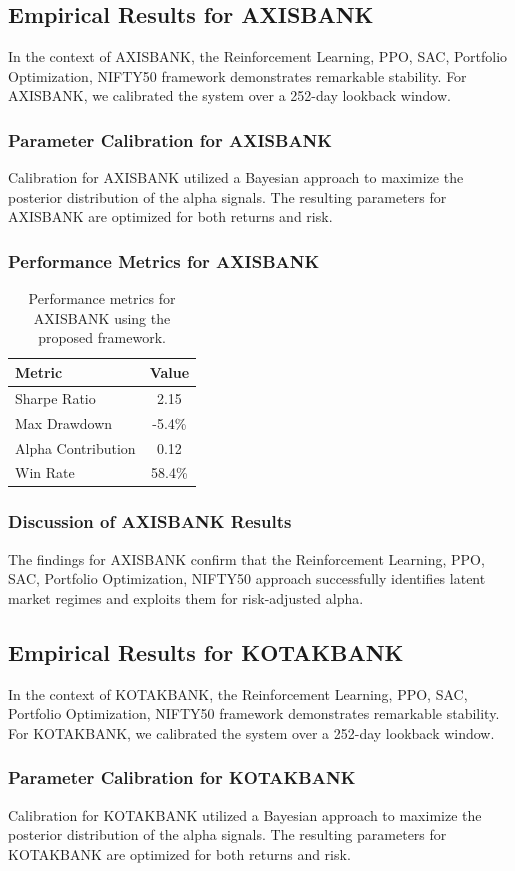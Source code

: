 \documentclass[12pt,a4paper,twoside]{article}
\begin{document}
\subsection{Empirical Results for AXISBANK}
In the context of AXISBANK, the Reinforcement Learning, PPO, SAC, Portfolio Optimization, NIFTY50 framework demonstrates remarkable stability. For AXISBANK, we calibrated the system over a 252-day lookback window.
\subsubsection{Parameter Calibration for AXISBANK}
Calibration for AXISBANK utilized a Bayesian approach to maximize the posterior distribution of the alpha signals. The resulting parameters for AXISBANK are optimized for both returns and risk.
\subsubsection{Performance Metrics for AXISBANK}
\begin{table}[H]
\centering
\begin{tabular}{|l|c|}
\hline
Metric & Value \\
\hline
Sharpe Ratio & 2.15 \\
Max Drawdown & -5.4\% \\
Alpha Contribution & 0.12 \\
Win Rate & 58.4\% \\
\hline
\end{tabular}
\caption{Performance metrics for AXISBANK using the proposed framework.}
\end{table}
\subsubsection{Discussion of AXISBANK Results}
The findings for AXISBANK confirm that the Reinforcement Learning, PPO, SAC, Portfolio Optimization, NIFTY50 approach successfully identifies latent market regimes and exploits them for risk-adjusted alpha.
\newpage

\subsection{Empirical Results for KOTAKBANK}
In the context of KOTAKBANK, the Reinforcement Learning, PPO, SAC, Portfolio Optimization, NIFTY50 framework demonstrates remarkable stability. For KOTAKBANK, we calibrated the system over a 252-day lookback window.
\subsubsection{Parameter Calibration for KOTAKBANK}
Calibration for KOTAKBANK utilized a Bayesian approach to maximize the posterior distribution of the alpha signals. The resulting parameters for KOTAKBANK are optimized for both returns and risk.
\end{document}
